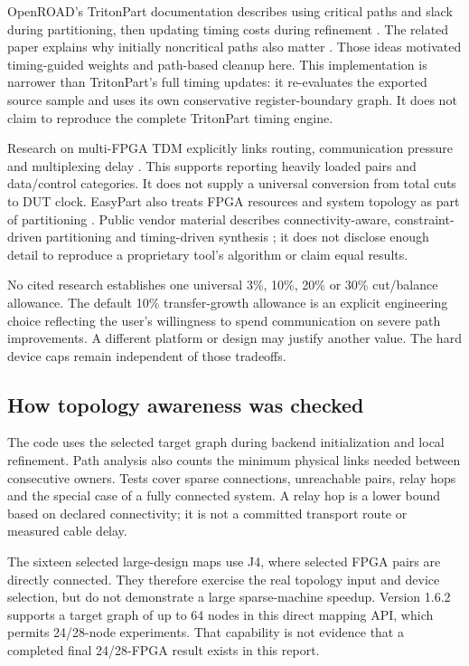 \documentclass[11pt]{article}
\begin{document}
OpenROAD's TritonPart documentation describes using critical paths and slack during partitioning, then updating timing costs during refinement \cite{openroad}. The related paper explains why initially noncritical paths also matter \cite{tritonpaper}. Those ideas motivated timing-guided weights and path-based cleanup here. This implementation is narrower than TritonPart's full timing updates: it re-evaluates the exported source sample and uses its own conservative register-boundary graph. It does not claim to reproduce the complete TritonPart timing engine.

Research on multi-FPGA TDM explicitly links routing, communication pressure and multiplexing delay \cite{tdm2020,tdm2023}. This supports reporting heavily loaded pairs and data/control categories. It does not supply a universal conversion from total cuts to DUT clock. EasyPart also treats FPGA resources and system topology as part of partitioning \cite{easypart}. Public vendor material describes connectivity-aware, constraint-driven partitioning and timing-driven synthesis \cite{vendor}; it does not disclose enough detail to reproduce a proprietary tool's algorithm or claim equal results.

No cited research establishes one universal 3\%, 10\%, 20\% or 30\% cut/balance allowance. The default 10\% transfer-growth allowance is an explicit engineering choice reflecting the user's willingness to spend communication on severe path improvements. A different platform or design may justify another value. The hard device caps remain independent of those tradeoffs.

\subsection{How topology awareness was checked}

The code uses the selected target graph during backend initialization and local refinement. Path analysis also counts the minimum physical links needed between consecutive owners. Tests cover sparse connections, unreachable pairs, relay hops and the special case of a fully connected system. A relay hop is a lower bound based on declared connectivity; it is not a committed transport route or measured cable delay.

The sixteen selected large-design maps use J4, where selected FPGA pairs are directly connected. They therefore exercise the real topology input and device selection, but do not demonstrate a large sparse-machine speedup. Version 1.6.2 supports a target graph of up to 64 nodes in this direct mapping API, which permits 24/28-node experiments. That capability is not evidence that a completed final 24/28-FPGA result exists in this report.
\end{document}
